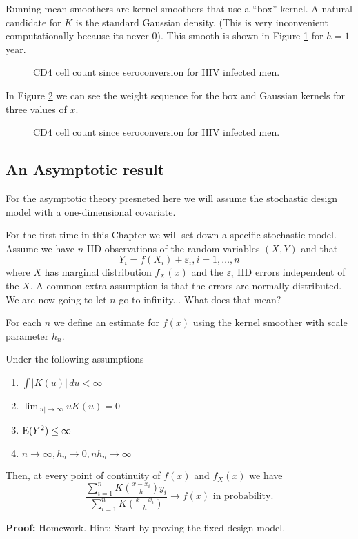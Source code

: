 Running mean smoothers are kernel smoothers that use a ``box'' kernel. A
natural candidate for $K$ is the standard Gaussian density. (This is 
very inconvenient computationally because its never 0).  This smooth
is shown in Figure \ref{f2.5} for $h=1$ year.


\begin{figure}[htp]
\caption{\label{f2.5} CD4 cell count since seroconversion for HIV infected men.}
\centerline{}
\end{figure}

In Figure \ref{f2.6} we can see the weight sequence for the box and Gaussian
kernels for three values of $x$.

\begin{figure}[htp]
\caption{\label{f2.6} CD4 cell count since seroconversion for HIV infected men.}
\centerline{}
\end{figure}


\newpage

\subsection{An Asymptotic result}
For the asymptotic theory presneted here we will assume the stochastic
design model with a one-dimensional covariate. 

For the first time in this Chapter we will set down a specific
stochastic model. Assume we have $n$ IID observations of the random
variables $(X,Y)$ 
and that  
\begin{equation}
\label{simplemodel}
Y_i = f(X_i) + \varepsilon_i, i=1,\dots,n
\end{equation}
where $X$ has marginal distribution $f_X(x)$ and the $\varepsilon_i$ IID
errors independent of the $X$. A common extra assumption is that the
errors are normally distributed.
We are now going to
let $n$ go to infinity... What does that mean?

For each $n$ we define an estimate for $f(x)$ using the kernel
smoother with scale parameter $h_n$.

\begin{theorem}
\label{t2.1}
Under the following assumptions
\begin{enumerate}
\item $\int |K(u)| \, du < \infty$
\item $\lim_{|u| \rightarrow \infty} uK(u) = 0$
\item $\mbox{E}(Y^2) \leq \infty$
\item $n \rightarrow \infty, h_n \rightarrow 0, nh_n \rightarrow
  \infty$
\end{enumerate}

Then, at every point of continuity of $f(x)$ and  $f_X(x)$ we have
\[
 \frac{ \sum_{i=1}^n K\left( \frac{x - x_i}{h} \right) y_i }
  { \sum_{i=1}^n K\left   ( \frac{ x - x_i }{h} \right)}
  \rightarrow f(x) \mbox{ in probability.}
\]
\end{theorem}

{\bf Proof:} Homework. Hint: Start by proving the fixed design model.

